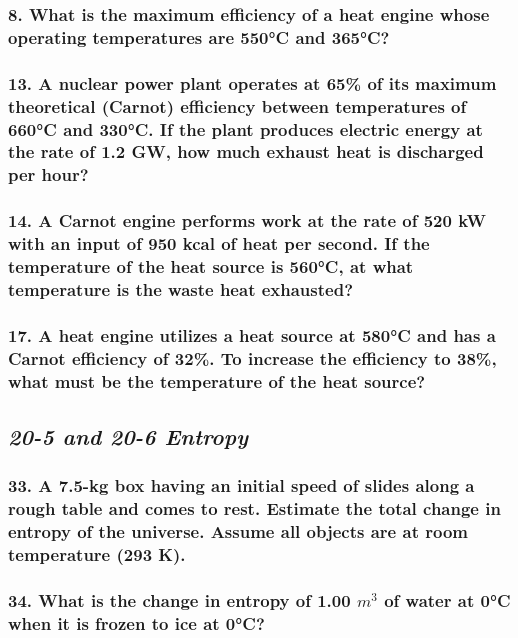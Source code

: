\documentclass{article}
\begin{document}
\subsubsection*{
    8. What is the maximum efficiency of a heat engine whose
    operating temperatures are 550°C and 365°C?
}
\vspace{3.5in}
\subsubsection*{
    13. A nuclear power plant operates at 65\% of its maximum
    theoretical (Carnot) efficiency between temperatures of 660°C
    and 330°C. If the plant produces electric energy at the rate of
    1.2 GW, how much exhaust heat is discharged per hour?
}
\newpage
\subsubsection*{
    14. A Carnot engine performs work at the rate of 520 kW
    with an input of 950 kcal of heat per second. If the
    temperature of the heat source is 560°C, at what temperature
    is the waste heat exhausted?
}
\vspace{3.5in}
\subsubsection*{
    17. A heat engine utilizes a heat source at 580°C and has a
    Carnot efficiency of 32\%. To increase the efficiency to 38\%,
    what must be the temperature of the heat source?
}
\newpage
\begin{center}
    \subsection*{\textbf{\textit{20-5 and 20-6 Entropy}}}
\end{center}
\subsubsection*{
    33. A 7.5-kg box having an initial speed of slides
    along a rough table and comes to rest. Estimate the total
    change in entropy of the universe. Assume all objects are at
    room temperature (293 K).
}
\vspace{3.5in}
\subsubsection*{
    34. What is the change in entropy of 1.00 $m^3$ of water at 0°C
    when it is frozen to ice at 0°C?
}
\newpage
\end{document}
